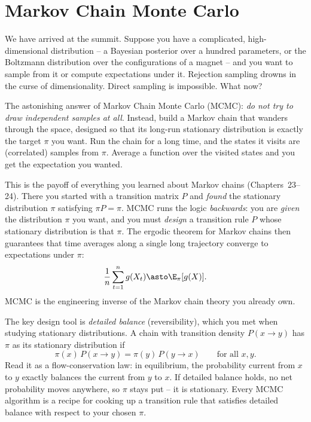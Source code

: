 \section{Markov Chain Monte Carlo}
\label{ch35:mcmc}

We have arrived at the summit. Suppose you have a complicated, high-dimensional
distribution -- a Bayesian posterior over a hundred parameters, or the
Boltzmann distribution over the configurations of a magnet -- and you want to
sample from it or compute expectations under it. Rejection sampling drowns in
the curse of dimensionality. Direct sampling is impossible. What now?

The astonishing answer of Markov Chain Monte Carlo (MCMC): \emph{do not try to
draw independent samples at all}. Instead, build a Markov chain that wanders
through the space, designed so that its long-run stationary distribution is
exactly the target $\pi$ you want. Run the chain for a long time, and the states
it visits are (correlated) samples from $\pi$. Average a function over the visited
states and you get the expectation you wanted.

\begin{connectionbox}
This is the payoff of everything you learned about Markov chains
(Chapters~23--24). There you started with a transition matrix $P$ and \emph{found}
the stationary distribution $\pi$ satisfying $\pi P = \pi$. MCMC runs the logic
\emph{backwards}: you are \emph{given} the distribution $\pi$ you want, and you
must \emph{design} a transition rule $P$ whose stationary distribution is that
$\pi$. The ergodic theorem for Markov chains then guarantees that time averages
along a single long trajectory converge to expectations under $\pi$:
\[
  \frac1n \sum_{t=1}^n g(X_t) \asto \E_\pi[g(X)].
\]
MCMC is the engineering inverse of the Markov chain theory you already own.
\end{connectionbox}

The key design tool is \emph{detailed balance} (reversibility), which you met
when studying stationary distributions. A chain with transition density
$P(x\to y)$ has $\pi$ as its stationary distribution if
\[
  \pi(x)\,P(x \to y) = \pi(y)\,P(y \to x) \qquad \text{for all } x,y.
\]
Read it as a flow-conservation law: in equilibrium, the probability current from
$x$ to $y$ exactly balances the current from $y$ to $x$. If detailed balance
holds, no net probability moves anywhere, so $\pi$ stays put -- it is stationary.
Every MCMC algorithm is a recipe for cooking up a transition rule that satisfies
detailed balance with respect to your chosen $\pi$.

